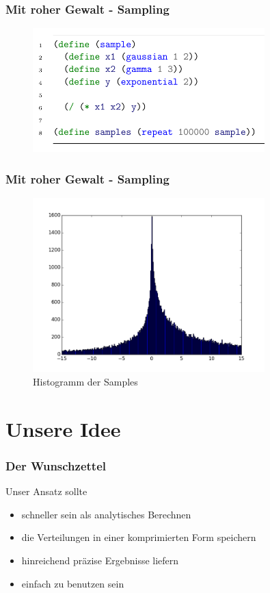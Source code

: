 \documentclass[11pt]{beamer}
\begin{document}
\begin{frame}[fragile]
  \frametitle{Mit roher Gewalt - Sampling}
  \begin{figure}
    \includegraphics[width=0.8\textwidth]{presentation/church-code}
  \end{figure}
\end{frame}

\begin{frame}
  \frametitle{Mit roher Gewalt - Sampling}
  \begin{figure}
    \includegraphics[width=0.8\textwidth]{thesis/introduction/church-pdf}
    \caption{Histogramm der Samples}
  \end{figure}
\end{frame}

\section{Unsere Idee}

\begin{frame}
  \frametitle{Der Wunschzettel}
  Unser Ansatz sollte
  \begin{itemize}
  \item schneller sein als analytisches Berechnen
  \item die Verteilungen in einer komprimierten Form speichern
  \item hinreichend präzise Ergebnisse liefern
  \item einfach zu benutzen sein
  \end{itemize}
\end{frame}
\end{document}
